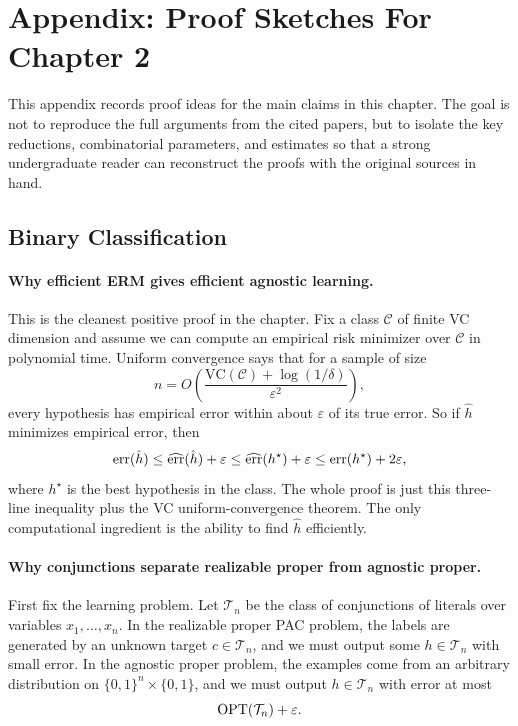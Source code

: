 \section{Appendix: Proof Sketches For Chapter 2}

This appendix records proof ideas for the main claims in this chapter. The goal is not to reproduce the full arguments from the cited papers, but to isolate the key reductions, combinatorial parameters, and estimates so that a strong undergraduate reader can reconstruct the proofs with the original sources in hand.

\subsection{Binary Classification}

\paragraph{Why efficient ERM gives efficient agnostic learning.}
This is the cleanest positive proof in the chapter. Fix a class $\mathcal{C}$ of finite VC dimension and assume we can compute an empirical risk minimizer over $\mathcal{C}$ in polynomial time. Uniform convergence says that for a sample of size
\[
n = O\!\left(\frac{\mathrm{VC}(\mathcal{C}) + \log(1/\delta)}{\varepsilon^2}\right),
\]
every hypothesis has empirical error within about $\varepsilon$ of its true error. So if $\hat h$ minimizes empirical error, then
\[
\operatorname{err}(\hat h) \le \widehat{\operatorname{err}}(\hat h) + \varepsilon \le \widehat{\operatorname{err}}(h^\star) + \varepsilon \le \operatorname{err}(h^\star) + 2\varepsilon,
\]
where $h^\star$ is the best hypothesis in the class. The whole proof is just this three-line inequality plus the VC uniform-convergence theorem. The only computational ingredient is the ability to find $\hat h$ efficiently.

\paragraph{Why conjunctions separate realizable proper from agnostic proper.}
First fix the learning problem. Let $\mathcal{T}_n$ be the class of conjunctions of literals over variables $x_1,\dots,x_n$. In the realizable proper PAC problem, the labels are generated by an unknown target $c \in \mathcal{T}_n$, and we must output some $h \in \mathcal{T}_n$ with small error. In the agnostic proper problem, the examples come from an arbitrary distribution on $\{0,1\}^n \times \{0,1\}$, and we must output $h \in \mathcal{T}_n$ with error at most
\[
\operatorname{OPT}(\mathcal{T}_n) + \varepsilon.
\]

